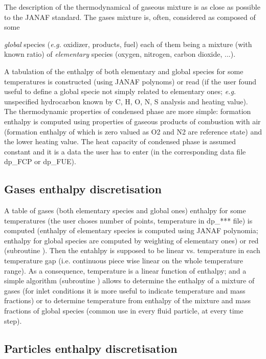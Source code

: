 The description of the thermodynamical of gaseous mixture is as close as
possible to the JANAF standard. The gases mixture is, often, considered as
composed of some {\textit{global} species (\emph{e.g.} oxidizer, products, fuel) each of
them being a mixture (with known ratio) of \textit{elementary} species
(oxygen, nitrogen, carbon dioxide, ...).

A tabulation of the enthalpy of both elementary and global species for some
temperatures is constructed (using JANAF polynoms) or read (if the user found
useful to define a global specie not simply related to elementary ones;
\emph{e.g.} unspecified hydrocarbon known by C, H, O, N, S analysis and heating
value). The thermodynamic properties of condensed phase are more simple:
formation enthalpy is computed using properties of gaseous products of
combustion with air (formation enthalpy of which is zero valued as O2 and N2
are reference state) and the lower heating value. The heat capacity of
condensed phase is assumed constant and it is a data the user has to enter (in
the corresponding data file dp\_FCP or dp\_FUE).

\subsection{Gases enthalpy discretisation}

A table of gases (both elementary species and global ones) enthalpy for some
temperatures (the user choses number of points, temperature in dp\_*** file) is
computed (enthalpy of elementary species is computed using JANAF polynomia;
enthalpy for global species are computed by weighting of elementary ones) or red
(subroutine ). Then the entahlpy is supposed to be linear
vs. temperature in each temperature gap (i.e. continuous piece wise linear on
the whole temperature range). As a consequence, temperature is a linear function
of enthalpy; and a simple algorithm (subroutine ) allows to
determine the enthalpy of a mixture of gases (for inlet conditions it is more
useful to indicate temperature and mass fractions) or to determine temperature
from enthalpy of the mixture and mass fractions of global species (common use in
every fluid particle, at every time step).

\subsection{Particles enthalpy discretisation}

}

